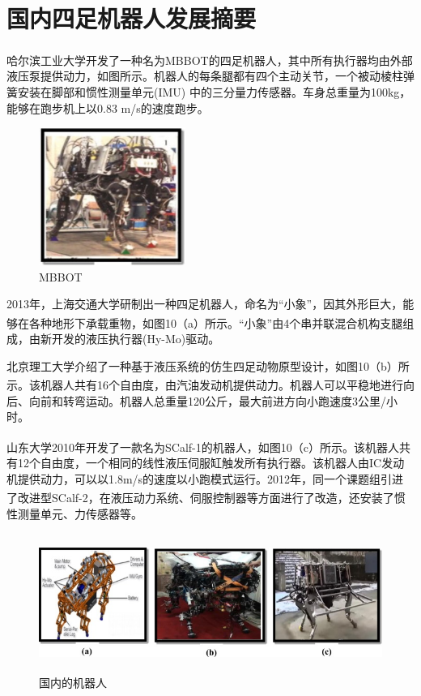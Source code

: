 \documentclass[12pt,a4paper]{ctexart}
\newcommand{\supercite}[1]{\textsuperscript{\cite{#1}}}
\begin{document}
\section{国内四足机器人发展摘要}
哈尔滨工业大学开发了一种名为MBBOT的四足机器人\supercite{24}，其中所有执行器均由外部液压泵提供动力，如图所示。机器人的每条腿都有四个主动关节，一个被动棱柱弹簧安装在脚部和惯性测量单元(IMU) 中的三分量力传感器。车身总重量为100kg，能够在跑步机上以0.83 m/s的速度跑步。
\begin{figure}[H]
    \centering
    \includegraphics[height=4.5cm]{IMG_11.jpg}
    \caption{MBBOT}
\end{figure}
2013年，上海交通大学研制出一种四足机器人，命名为“小象”，因其外形巨大，能够在各种地形下承载重物，如图10（a）所示\supercite{25}。“小象”由4个串并联混合机构支腿组成，由新开发的液压执行器(Hy-Mo)驱动。

北京理工大学介绍了一种基于液压系统的仿生四足动物原型设计，如图10（b）所示\supercite{26}。该机器人共有16个自由度，由汽油发动机提供动力。机器人可以平稳地进行向后、向前和转弯运动。机器人总重量120公斤，最大前进方向小跑速度3公里/小时。

山东大学2010年开发了一款名为SCalf-1的机器人\supercite{27}，如图10（c）所示。该机器人共有12个自由度，一个相同的线性液压伺服缸触发所有执行器。该机器人由IC发动机提供动力，可以以1.8m/s的速度以小跑模式运行。2012年，同一个课题组引进了改进型SCalf-2\supercite{28}，在液压动力系统、伺服控制器等方面进行了改造，还安装了惯性测量单元、力传感器等。
\begin{figure}[H]
    \centering
    \includegraphics[height=4.5cm]{IMG_10.jpg}
    \caption{国内的机器人}
\end{figure}
\end{document}
